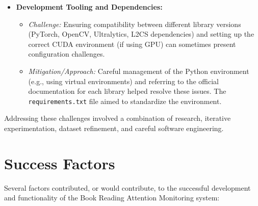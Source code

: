 \begin{itemize}
    \item \textbf{Development Tooling and Dependencies:}
    \begin{itemize}
        \item \textit{Challenge:} Ensuring compatibility between different library versions (PyTorch, OpenCV, Ultralytics, L2CS dependencies) and setting up the correct CUDA environment (if using GPU) can sometimes present configuration challenges.
        \item \textit{Mitigation/Approach:} Careful management of the Python environment (e.g., using virtual environments) and referring to the official documentation for each library helped resolve these issues. The \texttt{requirements.txt} file aimed to standardize the environment.
    \end{itemize}
\end{itemize}
Addressing these challenges involved a combination of research, iterative experimentation, dataset refinement, and careful software engineering.

\section{Success Factors}
Several factors contributed, or would contribute, to the successful development and functionality of the Book Reading Attention Monitoring system:

